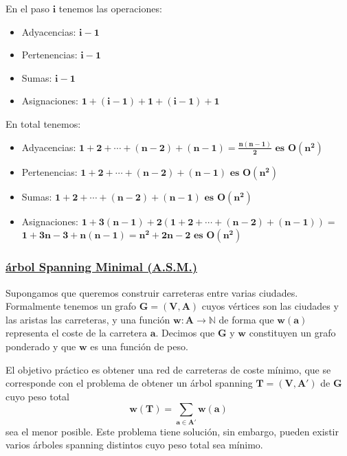 \documentclass[twoside]{report}
\newcommand{\bs}[1]{\boldsymbol{#1}}
\begin{document}
        \noindent En el paso $\bs{i}$ tenemos las operaciones:
        \begin{itemize}
        \item Adyacencias: $\bs{i-1}$
        \item Pertenencias: $\bs{i-1}$
        \item Sumas: $\bs{i-1}$
        \item Asignaciones: $\bs{1+(i-1)+1+(i-1)+1}$
        \end{itemize}
\vspace{0.3cm}
        \noindent En total tenemos:
        \begin{itemize}
        \item Adyacencias:
        $\bs{1+2+\cdots+(n-2)+(n-1)=\frac{n(n-1)}{2} \mbox{  es  } O(n^2)}$
        \item Pertenencias: $\bs{1+2+\cdots+(n-2)+(n-1)\mbox{  es  }O(n^2)}$
        \item Sumas: $\bs{1+2+\cdots+(n-2)+(n-1) \mbox{  es  }O(n^2)}$
        \item Asignaciones: $\bs{1+3(n-1)+2\left(1+2+\cdots+(n-2)+(n-1)\right)=}$\\
        $\bs{1+3n-3+n(n-1)=n^2+2n-2 \mbox{  es  }O(n^2)}$
        \end{itemize}

\vspace{0.4cm}
\subsubsection{\underline{árbol Spanning Minimal (A.S.M.)}}

Supongamos que queremos construir carreteras entre varias ciudades. Formalmente tenemos un grafo $\bs{G=(V,A)}$ cuyos vértices son las ciudades y las aristas las carreteras, y una función $\bs{w:A\rightarrow\mathbb{N}}$ de forma que $\bs{w(a)}$ representa el coste de la carretera $\bs{a}$. Decimos que $\bs{G}$ y $\bs{w}$ constituyen un grafo ponderado y que $\bs{w}$ es una función de peso.
\vspace{0.2cm}

El objetivo práctico es obtener una red de carreteras de coste mínimo, que se corresponde con el problema de obtener un árbol spanning $\bs{T=(V,A')}$ de $\bs{G}$ cuyo peso total $$\bs{w(T)=\sum_{a\in A'}w(a)}$$ sea el menor posible. Este problema tiene solución, sin embargo, pueden existir varios árboles spanning distintos cuyo peso total sea mínimo.
\vspace{0.6cm}
\end{document}
